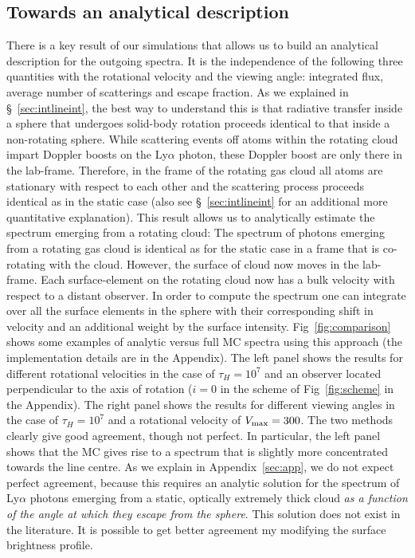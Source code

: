 \subsection{Towards an analytical description}
There is a key result of our simulations that allows us to build an
analytical description for the outgoing spectra.
It is the independence of the following three quantities with the rotational
velocity and the viewing angle: integrated flux, average number of
scatterings and escape fraction.
As we explained in \S~\ref{sec:intlineint}, the best way to understand this is that radiative transfer inside a sphere that undergoes solid-body rotation
proceeds identical to that inside a non-rotating sphere. While scattering events off atoms within the rotating cloud impart
Doppler boosts on the Ly$\alpha$ photon, these Doppler boost are only
there in the lab-frame. Therefore, in the frame of the rotating gas cloud all atoms are
stationary with respect to each other and the scattering process
proceeds identical as in the static case (also see \S~\ref{sec:intlineint} for an additional more quantitative explanation).
This result allows us to analytically estimate the spectrum emerging from a rotating cloud:
The spectrum of \lya photons emerging from a rotating gas cloud is identical as for the static case in a frame that is co-rotating
with the cloud. However, the surface of cloud now moves in the lab-frame.
Each surface-element on the rotating cloud now has a bulk
velocity with respect to a distant observer. In order to compute the
spectrum one can integrate over all the surface elements in the
sphere with their corresponding shift in velocity and an additional
weight by the surface intensity.
Fig~\ref{fig:comparison} shows some examples of analytic versus full MC
spectra using this approach (the implementation details are in the Appendix).
The left panel shows the results for different rotational velocities
in the case of $\tau_{H}=10^7$ and an observer located perpendicular
to the axis of rotation ($i=0$ in the scheme of Fig~\ref{fig:scheme}
in the Appendix). The right panel shows the results for different viewing angles in the
case of $\tau_{H}=10^7$ and a rotational velocity of $V_{\rm
max}=300$\kms.
The two methods clearly give good agreement, though not perfect. In particular, the left panel shows that the MC gives rise to a spectrum that is
slightly more concentrated towards the line centre. As we explain in Appendix~\ref{sec:app}, we do not expect perfect agreement, because this requires an analytic solution for the spectrum of Ly$\alpha$ photons emerging from a static, optically extremely thick cloud {\it as a function of the angle at which they escape from the sphere}. This solution does not exist in the literature. It is possible to get better agreement my modifying the surface brightness profile.
